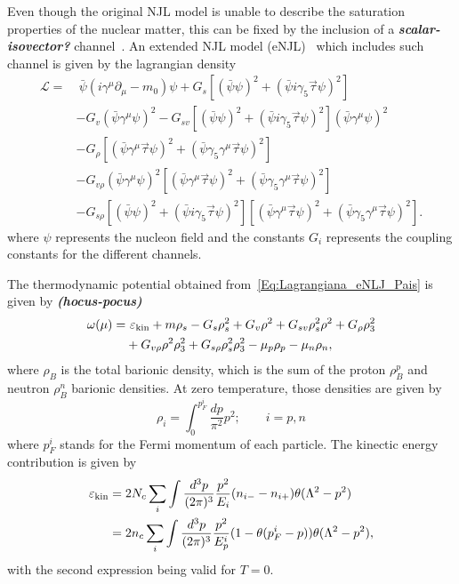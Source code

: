 \documentclass[prc, reprint, amsmath, linenumbers,10pt]{revtex4-1}
\newcommand{\comment}[1]{{\bf\textit{#1}}}
\begin{document}
Even though the original NJL model is unable to describe the saturation properties of the nuclear matter, this can be fixed by the inclusion of a \comment{scalar-isovector?} channel~\cite{Koch1987}. An extended NJL model (eNJL)~\cite{Pais2016} which includes such channel is given by the lagrangian density
\begin{equation}\label{Eq:Lagrangiana_eNLJ_Pais}
\begin{split}
	\mathcal{L} =&~ \bar{\psi}(i\gamma^\mu\partial_\mu - m_0)\psi + G_s[(\bar{\psi}\psi)^2 + (\bar{\psi}i\gamma_5\vec{\tau}\psi)^2] \\
	& - G_v(\bar{\psi}\gamma^\mu\psi)^2 - G_{sv}[(\bar{\psi}\psi)^2 + (\bar{\psi}i\gamma_5\vec{\tau}\psi)^2](\bar{\psi}\gamma^\mu\psi)^2 \\
	& - G_\rho[(\bar{\psi}\gamma^\mu\vec{\tau}\psi)^2 + (\bar{\psi}\gamma_5\gamma^\mu\vec{\tau}\psi)^2] \\
	& - G_{v\rho}(\bar{\psi}\gamma^\mu\psi)^2[(\bar{\psi}\gamma^\mu\vec{\tau}\psi)^2 + (\bar{\psi}\gamma_5\gamma^\mu\vec{\tau}\psi)^2] \\
	& - G_{s\rho} [(\bar{\psi}\psi)^2 + (\bar{\psi}i\gamma_5\vec{\tau}\psi)^2][(\bar{\psi}\gamma^\mu\vec{\tau}\psi)^2 + (\bar{\psi}\gamma_5\gamma^\mu\vec{\tau}\psi)^2].
\end{split}
\end{equation}
%
where $\psi$ represents the nucleon field and the constants $G_i$ represents the coupling constants for the different channels.

The thermodynamic potential obtained from~\eqref{Eq:Lagrangiana_eNLJ_Pais} is given by \comment{(hocus-pocus)}
\begin{equation}\label{Eq:potencial_termodinamico}
\begin{split}
	\omega(\mu) =&~ \varepsilon_{\rm{kin}} + m\rho_s - G_s\rho_s^2 + G_v\rho^2 + G_{sv}\rho_s^2\rho^2 + G_\rho\rho_3^2 \\
	&+ G_{v\rho}\rho^2\rho_3^2 + G_{s\rho}\rho_s^2\rho_3^2 - \mu_p\rho_p - \mu_n\rho_n,
\end{split}
\end{equation}
%
where $\rho_B$ is the total barionic density, which is the sum of the proton $\rho_B^p$ and neutron $\rho_B^n$ barionic densities. At zero temperature, those densities are given by
\begin{equation}
	\rho_i = \int_0^{p_F^i}\frac{dp}{\pi^2}p^2; \qquad i = p,n
\end{equation}
%
where $p_F^i$ stands for the Fermi momentum of each particle. The kinectic energy contribution is given by
\begin{align}
	\varepsilon_{\rm{kin}} &= 2 N_c\sum_i \int \frac{d^3p}{(2\pi)^3}\frac{p^2}{E_i}(n_{i-}-n_{i+})\theta(\Lambda^2 - p^2) \\
	&= 2 n_c \sum_i \int \frac{d^3p}{(2\pi)^3}\frac{p^2}{E_p^i}(1 - \theta(p_F^i - p))\theta(\Lambda^2 - p^2),
\end{align}
%
with the second expression being valid for $T = 0$.
\end{document}
